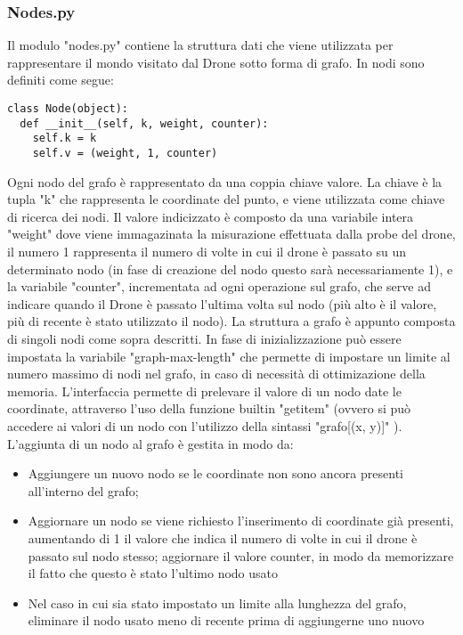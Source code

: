 \subsubsection{Nodes.py}
Il modulo "nodes.py" contiene la struttura dati che viene utilizzata per rappresentare il mondo visitato dal Drone sotto forma di grafo. In nodi sono definiti come segue:
\begin{verbatim} 
class Node(object):
  def __init__(self, k, weight, counter):
    self.k = k
    self.v = (weight, 1, counter)
\end{verbatim}
Ogni nodo del grafo è rappresentato da una coppia chiave valore. La chiave è la tupla "k" che rappresenta le coordinate del punto, e viene utilizzata come chiave di ricerca dei nodi. Il valore indicizzato è composto da una variabile intera "weight" dove viene immagazinata la misurazione effettuata dalla probe del drone, il numero 1 rappresenta il numero di volte in cui il drone è passato su un determinato nodo (in fase di creazione del nodo questo sarà necessariamente 1), e la variabile "counter", incrementata ad ogni operazione sul grafo, che serve ad indicare quando il Drone è passato l'ultima volta sul nodo (più alto è il valore, più di recente è stato utilizzato il nodo). 
La struttura a grafo è appunto composta di singoli nodi come sopra descritti. In fase di inizializzazione può essere impostata la variabile "graph-max-length" che permette di impostare un limite al numero massimo di nodi nel grafo, in caso di necessità di ottimizazione della memoria. L'interfaccia permette di prelevare il valore di un nodo date le coordinate, attraverso l'uso della funzione builtin "getitem" (ovvero si può accedere ai valori di un nodo con l'utilizzo della sintassi "grafo[(x, y)]" ). L'aggiunta di un nodo al grafo è gestita in modo da:
\begin{itemize}
\item Aggiungere un nuovo nodo se le coordinate non sono ancora presenti all'interno del grafo;

\item Aggiornare un nodo se viene richiesto l'inserimento di coordinate già presenti, aumentando di 1 il valore che indica il numero di volte in cui il drone è passato sul nodo stesso; aggiornare il valore counter, in modo da memorizzare il fatto che questo è stato l'ultimo nodo usato

\item Nel caso in cui sia stato impostato un limite alla lunghezza del grafo, eliminare il nodo usato meno di recente prima di aggiungerne uno nuovo
\end{itemize}

